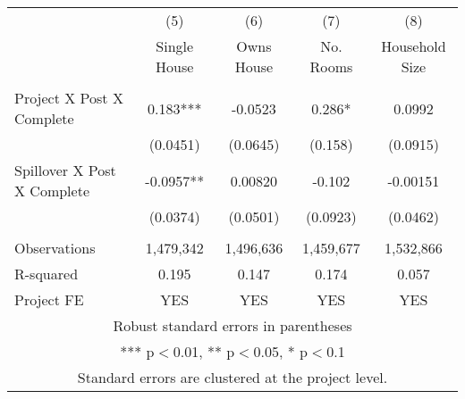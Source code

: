 
\begin{tabular}{lcccc} \hline
 & (5) & (6) & (7) & (8) \\
 & Single House & Owns House & No. Rooms & Household Size \\ \hline
   &  &  &  &  \\
Project X Post X Complete  & 0.183*** & -0.0523 & 0.286* & 0.0992 \\
  & (0.0451) & (0.0645) & (0.158) & (0.0915) \\
 Spillover X Post X Complete  & -0.0957** & 0.00820 & -0.102 & -0.00151 \\
 & (0.0374) & (0.0501) & (0.0923) & (0.0462) \\
   &  &  &  &  \\
Observations  & 1,479,342 & 1,496,636 & 1,459,677 & 1,532,866 \\
R-squared  & 0.195 & 0.147 & 0.174 & 0.057 \\
 Project FE & YES & YES & YES & YES \\ \hline
\multicolumn{5}{c}{ Robust standard errors in parentheses} \\
\multicolumn{5}{c}{ *** p$<$0.01, ** p$<$0.05, * p$<$0.1} \\
\multicolumn{5}{c}{ Standard errors are clustered at the project level.} \\
\end{tabular}
